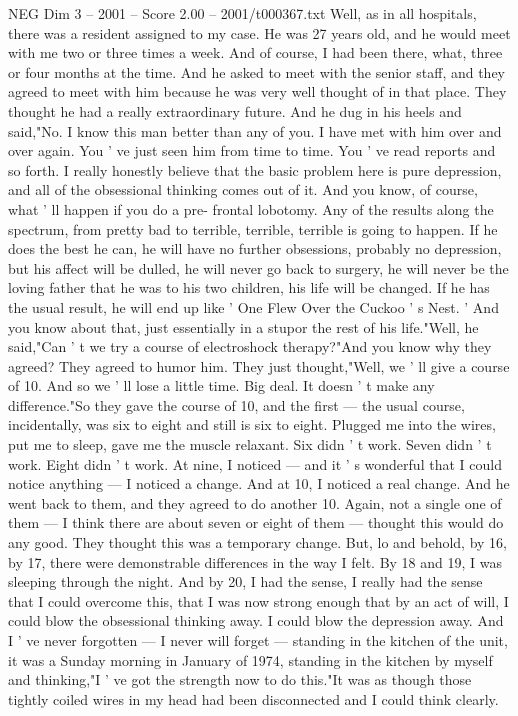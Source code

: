 \begin{textsample}{NEG Dim 3 – 2001 – Score 2.00 – 2001/t000367.txt}
Well, as in all hospitals, there was a resident assigned to my case.
He was 27 years old, and he would meet with me two or three times a week.
And of course, I had been there, what, three or four months at the time.
And he asked to meet with the senior staff, and they agreed to meet with him because he was very well thought of in that place.
They thought he had a really extraordinary future.
And he dug in his heels and said,"No.
I know this man better than any of you.
I have met with him over and over again.
You ' ve just seen him from time to time.
You ' ve read reports and so forth.
I really honestly believe that the basic problem here is pure depression, and all of the obsessional thinking comes out of it.
And you know, of course, what ' ll happen if you do a pre- frontal lobotomy.
Any of the results along the spectrum, from pretty bad to terrible, terrible, terrible is going to happen.
If he does the best he can, he will have no further obsessions, probably no depression, but his affect will be dulled, he will never go back to surgery, he will never be the loving father that he was to his two children, his life will be changed.
If he has the usual result, he will end up like ' One Flew Over the Cuckoo ' s Nest. ' And you know about that, just essentially in a stupor the rest of his life."Well, he said,"Can ' t we try a course of electroshock therapy?"And you know why they agreed?
They agreed to humor him.
They just thought,"Well, we ' ll give a course of 10.
And so we ' ll lose a little time.
Big deal.
It doesn ' t make any difference."So they gave the course of 10, and the first — the usual course, incidentally, was six to eight and still is six to eight.
Plugged me into the wires, put me to sleep, gave me the muscle relaxant.
Six didn ' t work.
Seven didn ' t work.
Eight didn ' t work.
At nine, I noticed — and it ' s wonderful that I could notice anything — I noticed a change.
And at 10, I noticed a real change.
And he went back to them, and they agreed to do another 10.
Again, not a single one of them — I think there are about seven or eight of them — thought this would do any good.
They thought this was a temporary change.
But, lo and behold, by 16, by 17, there were demonstrable differences in the way I felt.
By 18 and 19, I was sleeping through the night.
And by 20, I had the sense, I really had the sense that I could overcome this, that I was now strong enough that by an act of will, I could blow the obsessional thinking away.
I could blow the depression away.
And I ' ve never forgotten — I never will forget — standing in the kitchen of the unit, it was a Sunday morning in January of 1974, standing in the kitchen by myself and thinking,"I ' ve got the strength now to do this."It was as though those tightly coiled wires in my head had been disconnected and I could think clearly.

\end{textsample}
